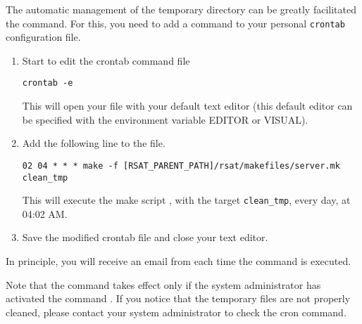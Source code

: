 \documentclass[12pt,a4paper, twoside]{scrreprt} %
\begin{document}
The automatic management of the temporary directory can be greatly
facilitated the  command. For this, you need to add a
command to your personal \texttt{crontab} configuration file.

\begin{enumerate}
\item Start to edit the crontab command file

\begin{lstlisting}
crontab -e
\end{lstlisting}

This will open your  file with your default text editor
(this default editor can be specified with the environment variable
EDITOR or VISUAL).

\item Add the following line to the  file. 

\begin{lstlisting}
02 04 * * * make -f [RSAT_PARENT_PATH]/rsat/makefiles/server.mk clean_tmp
\end{lstlisting}

This will execute the make script , with the target
\texttt{clean\_tmp}, every day, at 04:02 AM. 

\item Save the modified crontab file and close your text editor.

\end{enumerate}

In principle, you will receive an email from  each
time the command is executed.

Note that the command  takes effect only if the
system administrator has activated the command . If you
notice that the temporary files are not properly cleaned, please
contact your system administrator to check the cron command.
\end{document}
